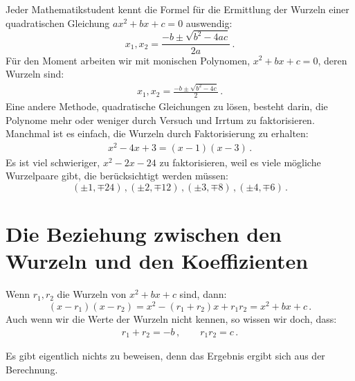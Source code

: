Jeder Mathematikstudent kennt die Formel für die Ermittlung der Wurzeln einer quadratischen Gleichung $ax^2+bx+c=0$ auswendig:
\[
x_1, x_2 = \frac{-b\pm\sqrt{b^2-4ac}}{2a}\,.
\]                      
Für den Moment arbeiten wir mit monischen Polynomen, $x^2+bx+c=0$, deren Wurzeln sind:
\begin{align}
x_1, x_2 = \frac{-b\pm\sqrt{b^2-4c}}{2}\,.\label{eq.quadratic-roots}
\end{align}
Eine andere Methode, quadratische Gleichungen zu lösen, besteht darin, die Polynome mehr oder weniger durch Versuch und Irrtum zu faktorisieren. Manchmal ist es einfach, die Wurzeln durch Faktorisierung zu erhalten:
\begin{align}
x^2-4x+3= (x-1)(x-3)\label{eq.quadratic-lill}\,.
\end{align}
Es ist viel schwieriger, $x^2-2x-24$ zu faktorisieren, weil es viele mögliche Wurzelpaare gibt, die berücksichtigt werden müssen:
\[
(\pm 1,\mp 24)\,, (\pm 2,\mp 12)\,, (\pm 3,\mp 8)\,, (\pm 4,\mp 6)\,.
\]

\section{Die Beziehung zwischen den Wurzeln und den Koeffizienten}\label{s.computing}

\begin{theorem}\label{thm.roots-coefficients}
Wenn $r_1,r_2$ die Wurzeln von $x^2+bx+c$ sind, dann:
\[
(x-r_1)(x-r_2)=x^2 - (r_1+r_2)x + r_1r_2=x^2+bx+c\,.
\]
Auch wenn wir die Werte der Wurzeln nicht kennen, so wissen wir doch, dass:
\begin{align}\label{eq.viete-quad}
r_1+r_2 = -b\,,\quad\quad r_1r_2=c\,.
\end{align}
\end{theorem}

Es gibt eigentlich nichts zu beweisen, denn das Ergebnis ergibt sich aus der Berechnung.


